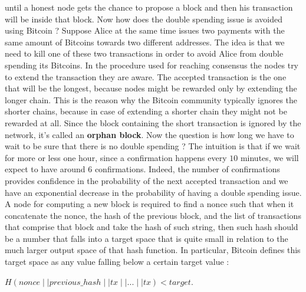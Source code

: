 until a honest node gets the chance to propose a block and then his transaction will be inside that block. Now how does the double spending issue is avoided using Bitcoin ? Suppose Alice at the same time issues two payments with the same amount of Bitcoins towards two different addresses. The idea is that we need to kill one of these two transactions in order to avoid Alice from double spending its Bitcoins. In the procedure used for reaching consensus the nodes try to extend the transaction they are aware. The accepted transaction is the one that will be the longest, because nodes might be rewarded only by extending the longer chain. This is the reason why the Bitcoin community typically ignores the shorter chains, because in case of extending a shorter chain they might not be rewarded at all. Since the block containing the short transaction is ignored by the network, it's called an \textbf{orphan block}. Now the question is how long we have to wait to be sure that there is no double spending ? The intuition is that if we wait for more or less one hour, since a confirmation happens every $10$ minutes, we will expect to have around $6$ confirmations. Indeed, the number of confirmations provides confidence in the probability of the next accepted transaction and we have an exponential decrease in the probability of having a double spending issue. A node for computing a new block is required to find a nonce such that when it concatenate the nonce, the hash of the previous block, and the list of transactions that comprise that block and take the hash of such string, then such hash should be a number that falls into a target space that is quite small in relation to the much larger output space of that hash function. In particular, Bitcoin defines this target space as any value falling below a certain target value :
\begin{center}
$H(nonce \mid \mid previous\_hash \mid \mid tx \mid \mid ... \mid \mid tx) < target$.
\end{center}
